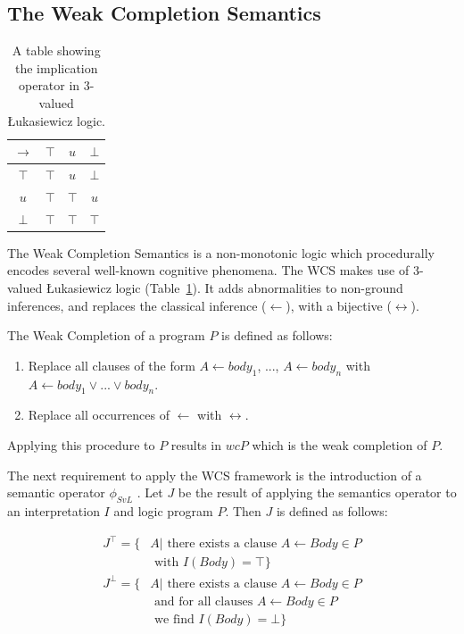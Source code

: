 \documentclass{article}
\begin{document}
\subsection{The Weak Completion Semantics}

\begin{table}
\begin{center}


\begin{tabular}{ c | c c c }
  $\rightarrow$& $\top$ & $u$ & $\bot$ \\ \hline
 $\top$ & $\top$ & $u$ & $\bot$ \\  
 $u$ & $\top$ & $\top$ & $u$\\  
 $\bot$ & $\top$ & $\top$ & $\top$
\end{tabular}
\caption{A table showing the implication operator in 3-valued \L ukasiewicz logic.}
\label{tbl:luk}

\end{center}
\end{table}

The Weak Completion Semantics is a non-monotonic logic which procedurally encodes several well-known cognitive phenomena. The WCS makes use of 3-valued \L ukasiewicz logic (Table~\ref{tbl:luk}). It adds abnormalities to non-ground inferences, and replaces the classical inference ($\leftarrow$), with a bijective ($\leftrightarrow$). 

The Weak Completion of a program $P$ is defined as follows:

\begin{enumerate}
\item Replace all clauses of the form $A \leftarrow body_1$, ..., $A \leftarrow body_n$ with $A \leftarrow body_1 \lor ... \lor body_n$.
\item Replace all occurrences of $\leftarrow$ with $\leftrightarrow$.
\end{enumerate}

Applying this procedure to $P$ results in $wcP$ which is the weak completion of $P$.

The next requirement to apply the WCS framework is the introduction of a semantic operator $\phi_{SvL}$ \citep{stenning2008interpretation}. Let $J$ be the result of applying the semantics operator to an interpretation $I$ and logic program $P$. Then $J$ is defined as follows:

\[
\begin{split}
J^\top = \{ & A | \textrm{ there exists a clause } A\leftarrow Body \in P \\ & \textrm{ with } I(Body) = \top\}
\end{split}
\]
\[
\begin{split}
J^\bot = \{ &  A | \textrm{ there exists a clause } A \leftarrow Body \in P \\
           & \textrm{ and for all clauses } A \leftarrow Body \in P \\ & \textrm{ we find } I(Body) = \bot\}
\end{split}
\]
\end{document}
